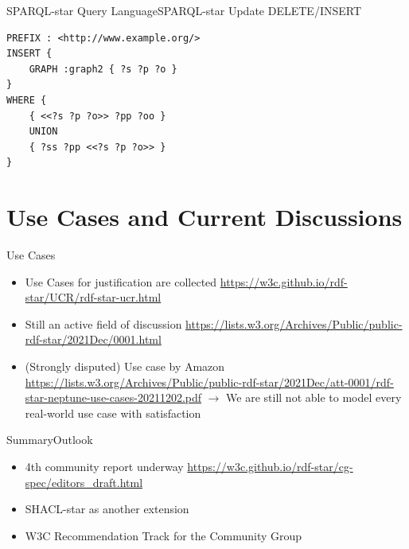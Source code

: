 \documentclass[aspectratio=169]{beamer}
\begin{document}
\begin{frame}[fragile]{SPARQL-star Query Language}{SPARQL-star Update}
 DELETE/INSERT
\begin{lstlisting}[language=SPARQL]
PREFIX : <http://www.example.org/>
INSERT {
    GRAPH :graph2 { ?s ?p ?o }
}
WHERE {
    { <<?s ?p ?o>> ?pp ?oo }
    UNION
    { ?ss ?pp <<?s ?p ?o>> }    
}
\end{lstlisting}
\end{frame}

\section{Use Cases and Current Discussions}
\begin{frame}{Use Cases}
 \begin{itemize}
     \item Use Cases for justification are collected \url{https://w3c.github.io/rdf-star/UCR/rdf-star-ucr.html}
     \item Still an active field of discussion \url{https://lists.w3.org/Archives/Public/public-rdf-star/2021Dec/0001.html}
     \item (Strongly disputed) Use case by Amazon \url{https://lists.w3.org/Archives/Public/public-rdf-star/2021Dec/att-0001/rdf-star-neptune-use-cases-20211202.pdf} $\rightarrow$ We are still not able to model every real-world use case with satisfaction
 \end{itemize}

\end{frame}

\begin{frame}{Summary}{Outlook}
	\begin{itemize}
	    \item 4th community report underway \url{https://w3c.github.io/rdf-star/cg-spec/editors_draft.html}
		\item SHACL-star as another extension
		\item W3C Recommendation Track for the Community Group
\end{itemize}
\end{frame}
\end{document}
